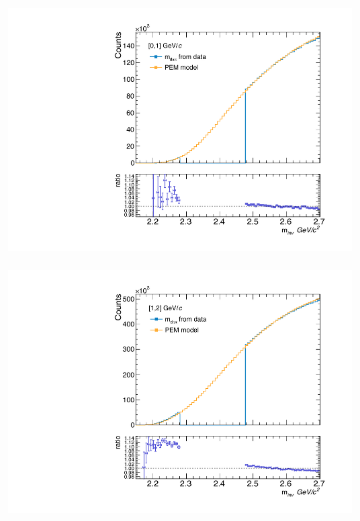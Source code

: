 \begin{figure}
\begin{subfigure}{.33\textwidth}
  \centering
  \captionsetup{justification=centering}
  \includegraphics[width=\linewidth]{gfx/01}
  \caption{}
  \label{fig:pem01}
\end{subfigure}%
\begin{subfigure}{.33\textwidth}
  \centering
  \captionsetup{justification=centering}
  \includegraphics[width=\linewidth]{gfx/12}
  \caption{}
  \label{fig:pem12}
\end{subfigure}
\begin{subfigure}{.33\textwidth}
  \centering
  \captionsetup{justification=centering}

\end{subfigure}
\end{figure}
